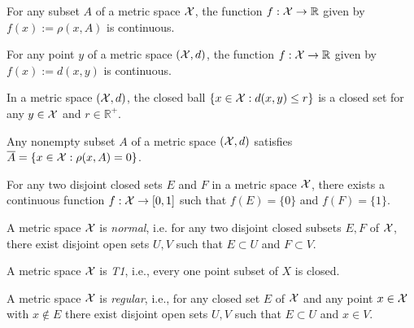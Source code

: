 \begin{lem}
  \label{lem:distPointAndSetContinuous}
  For any subset $A$ of a metric space ${\cal X}$,
  the function $f: {\cal X}\rightarrow \mathbb{R}$
  given by $f(x):= \rho(x,A)$ is continuous.
\end{lem}

\begin{coro}
  \label{coro:metricContinuous}
  For any point $y$ of a metric space $({\cal X},d)$,
  the function $f: {\cal X}\rightarrow \mathbb{R}$
  given by $f(x):= d(x,y)$ is continuous.
\end{coro}

\begin{coro}
  \label{coro:closedBallIsClosed}
  In a metric space $({\cal X},d)$,
  the closed ball $\{x\in{\cal X}: d(x,y)\le r\}$
  is a closed set for any $y\in {\cal X}$ and $r\in\mathbb{R}^+$.
\end{coro}

\begin{lem}
  \label{lem:defineClosureFromDistance}
  Any nonempty subset $A$ of a metric space $({\cal X},d)$
  satisfies $\overline{A}=\{x\in{\cal X}: \rho(x,A)=0\}$.
\end{lem}

\begin{lem}
  \label{lem:separateClosedSets}
  For any two disjoint closed sets $E$ and $F$
  in a metric space ${\cal X}$,
  there exists a continuous function $f:{\cal X}\rightarrow [0,1]$
  such that $f(E)=\{0\}$ and $f(F)=\{1\}$.
\end{lem}

\begin{coro}
  \label{coro:metricSpaceIsNormal}
  A metric space ${\cal X}$ is \emph{normal},
  i.e.
  for any two disjoint closed subsets $E,F$ of ${\cal X}$,
  there exist disjoint open sets $U,V$
  such that $E\subset U$ and $F\subset V$.
\end{coro}

\begin{coro}
  \label{coro:metricSpaceIsT1}
  A metric space ${\cal X}$ is \emph{T1},
  i.e., every one point subset of $X$ is closed.
\end{coro}

\begin{coro}
  \label{coro:metricSpaceIsRegular}
  A metric space ${\cal X}$ is \emph{regular},
  i.e., 
  for any closed set $E$ of ${\cal X}$
  and any point $x\in{\cal X}$ with $x\not\in E$
  there exist disjoint open sets $U,V$
  such that $E\subset U$ and $x\in V$.
\end{coro}

